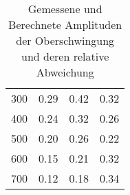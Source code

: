\begin{table}[!h]
\begin{tabular}{|c|c|c|c|}
		\num{300}  & \num{0.29}  & \num{0.42} & \num{0.32} \\
		\num{400}  & \num{0.24}  & \num{0.32} & \num{0.26} \\
		\num{500}  &\num{0.20}    & \num{0.26} & \num{0.22} \\
		\num{600}  & \num{0.15}  & \num{0.21} & \num{0.32} \\
		\num{700}  & \num{0.12}  & \num{0.18} & \num{0.34} \\
		\hline
	\end{tabular}
	\caption{Gemessene und Berechnete Amplituden der Oberschwingung\\ \hspace*{2.1cm}und deren relative Abweichung \label{tab:Analyse1}}
\end{table}